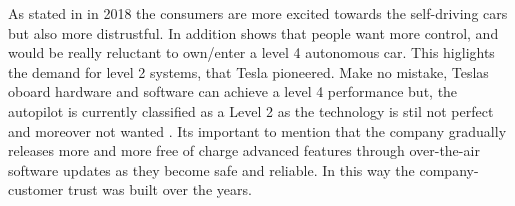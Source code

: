 \documentclass{article} %
\begin{document}
As stated in \cite{Pilot:Awareness} in 2018 the consumers are more excited towards the self-driving cars \cite{Feedback Users Autopilot} but also more distrustful. In addition \cite{Pilot:Awareness} shows that people want more control, and would be really reluctant to own/enter a level 4 autonomous car. This higlights the demand for level 2 systems, that Tesla pioneered.
Make no mistake, Teslas oboard hardware and software can achieve a level 4 performance \cite{Full Self-Driving} but, the autopilot is currently classified as a Level 2 as the technology is stil not perfect and moreover not wanted \cite{Pilot:Awareness} \cite{Pilot:CheatSheet}.
Its important to mention that the company gradually releases more and more free of charge advanced features through over-the-air software updates as they become safe and reliable.
In this way  the company-customer trust was built over the years.


\end{document}
